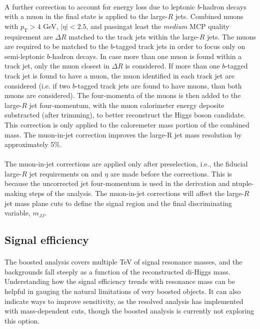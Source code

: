 \paragraph{}
A further correction to account for energy loss due to leptonic $b$-hadron decays with a muon in the final state is applied to the large-$R$ jets. Combined muons with $p_\text{T} > 4$ GeV, $|\eta| < 2.5$, and passingat least the \textit{medium} MCP quality requirement are $\Delta R$ matched to the track jets within the large-$R$ jets.  The muons are required to be matched to the $b$-tagged track jets in order to focus only on semi-leptonic $b$-hadron decays.  In case more than one muon is found within a track jet, only the muon closest in $\Delta R$ is considered.  If more than one $b$-tagged track jet is found to have a muon,  the muon identified in each track jet are considered (i.e. if two $b$-tagged track jets are found to have muons, than both muons are considered). The four-momenta of the muons is then added to the large-$R$ jet four-momentum, with the muon calorimeter energy deposite substracted (after trimming), to better reconstruct the Higgs boson candidate. This correction is only applied to the caloremeter mass portion of the combined mass. The muon-in-jet correction improves the large-R jet mass resolution by approximately 5\%.

\paragraph{}
The muon-in-jet corrections are applied only after preselection, i.e., the fiducial large-$R$ jet requirements on \pt and $\eta$ are made before the corrections. This is because the uncorrected jet four-momentum is used in the derivation and ntuple-making steps of the analysis. The muon-in-jet corrections will affect the large-$R$ jet mass plane cuts to define the signal region and the final discriminating variable, $m_{JJ}$.


\subsection{Signal efficiency}

\paragraph{}
The boosted analysis covers multiple TeV of signal resonance masses, and the backgrounds fall steeply as a function of the reconstructed di-Higgs mass. Understanding how the signal efficiency trends with resonance mass can be helpful in gauging the natural limitations of very boosted objects. It can also indicate ways to improve sensitivity, as the resolved analysis has implemented with mass-dependent cuts, though the boosted analysis is currently not exploring this option.

